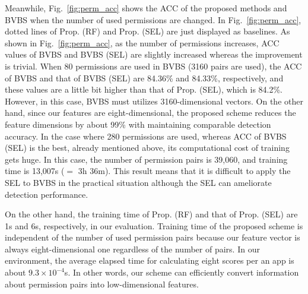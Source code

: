 \documentclass{ieeeaccess}
\newcommand{\myfigurename}{Fig.}
\begin{document}
Meanwhile, \myfigurename~\ref{fig:perm_acc} shows the ACC of the proposed methods and BVBS when the number of used permissions are changed.
In \myfigurename~\ref{fig:perm_acc}, dotted lines of Prop. (RF) and Prop. (SEL) are just displayed as baselines.
As shown in \myfigurename~\ref{fig:perm_acc}, as the number of permissions increases, ACC values of BVBS and BVBS (SEL) are slightly increased whereas the improvement is trivial.
When 80 permissions are used in BVBS (3160 pairs are used), the ACC of BVBS and that of BVBS (SEL) are 84.36\% and 84.33\%, respectively, and these values are a little bit higher than that of Prop. (SEL), which is 84.2\%.
However, in this case, BVBS must utilizes 3160-dimensional vectors.
On the other hand, since our features are eight-dimensional, the proposed scheme reduces the feature dimensions by about 99\% with maintaining comparable detection accuracy.  
In the case where 280 permissions are used, whereas ACC of BVBS (SEL) is the best, already mentioned above, its computational cost of training gets huge.
In this case, the number of permission pairs is 39,060, and training time is 13,007s ($=$ 3h 36m).
This result means that it is difficult to apply the SEL to BVBS in the practical situation although the SEL can ameliorate detection performance.

On the other hand, the training time of Prop. (RF) and that of Prop. (SEL) are 1s and 6s, respectively, in our evaluation.
Training time of the proposed scheme is independent of the number of used permission pairs because our feature vector is always eight-dimensional one regardless of the number of pairs. 
In our environment, the average elapsed time for calculating eight scores per an app is about $9.3 \times 10^{-4}$s.
In other words, our scheme can efficiently convert information about permission pairs into low-dimensional features.
\end{document}
